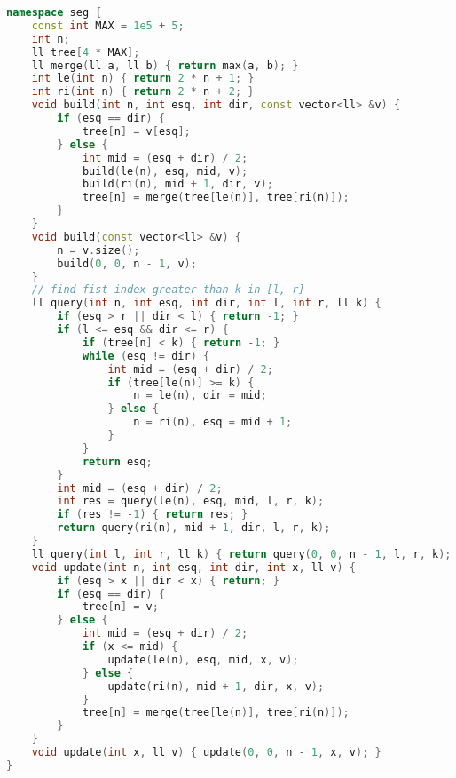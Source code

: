 \documentclass[11pt, a4paper, twoside]{article}
\begin{document}
\begin{lstlisting}[language=C++]
namespace seg {
    const int MAX = 1e5 + 5;
    int n;
    ll tree[4 * MAX];
    ll merge(ll a, ll b) { return max(a, b); }
    int le(int n) { return 2 * n + 1; }
    int ri(int n) { return 2 * n + 2; }
    void build(int n, int esq, int dir, const vector<ll> &v) {
        if (esq == dir) {
            tree[n] = v[esq];
        } else {
            int mid = (esq + dir) / 2;
            build(le(n), esq, mid, v);
            build(ri(n), mid + 1, dir, v);
            tree[n] = merge(tree[le(n)], tree[ri(n)]);
        }
    }
    void build(const vector<ll> &v) {
        n = v.size();
        build(0, 0, n - 1, v);
    }
    // find fist index greater than k in [l, r]
    ll query(int n, int esq, int dir, int l, int r, ll k) {
        if (esq > r || dir < l) { return -1; }
        if (l <= esq && dir <= r) {
            if (tree[n] < k) { return -1; }
            while (esq != dir) {
                int mid = (esq + dir) / 2;
                if (tree[le(n)] >= k) {
                    n = le(n), dir = mid;
                } else {
                    n = ri(n), esq = mid + 1;
                }
            }
            return esq;
        }
        int mid = (esq + dir) / 2;
        int res = query(le(n), esq, mid, l, r, k);
        if (res != -1) { return res; }
        return query(ri(n), mid + 1, dir, l, r, k);
    }
    ll query(int l, int r, ll k) { return query(0, 0, n - 1, l, r, k); }
    void update(int n, int esq, int dir, int x, ll v) {
        if (esq > x || dir < x) { return; }
        if (esq == dir) {
            tree[n] = v;
        } else {
            int mid = (esq + dir) / 2;
            if (x <= mid) {
                update(le(n), esq, mid, x, v);
            } else {
                update(ri(n), mid + 1, dir, x, v);
            }
            tree[n] = merge(tree[le(n)], tree[ri(n)]);
        }
    }
    void update(int x, ll v) { update(0, 0, n - 1, x, v); }
}
\end{lstlisting}
\end{document}
